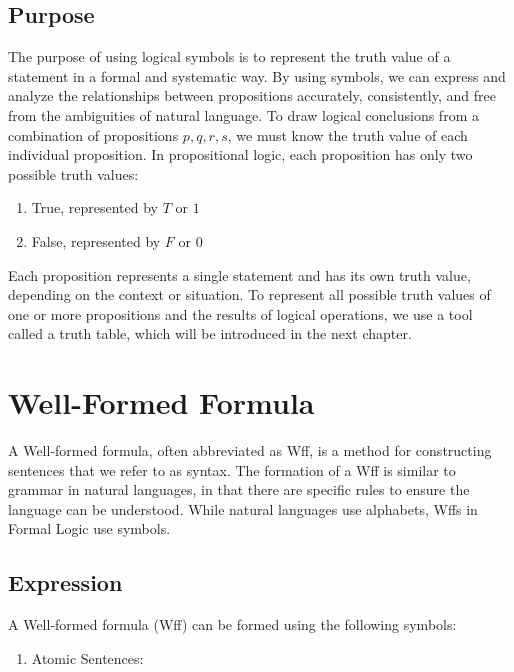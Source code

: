 \documentclass[12pt,a4paper,openany]{article}
\begin{document}
\subsection{Purpose}\label{purpose}

The purpose of using logical symbols is to represent the truth value of
a statement in a formal and systematic way. By using symbols, we can
express and analyze the relationships between propositions accurately,
consistently, and free from the ambiguities of natural language. To draw
logical conclusions from a combination of propositions \(p, q, r, s\),
we must know the truth value of each individual proposition. In
propositional logic, each proposition has only two possible truth values:

\begin{enumerate}
\item True, represented by \(T\) or \(1\)
\item False, represented by \(F\) or \(0\)
\end{enumerate}

Each proposition represents a single statement and has its own truth
value, depending on the context or situation. To represent all possible
truth values of one or more propositions and the results of logical
operations, we use a tool called a truth table, which will be
introduced in the next chapter.

\section{Well-Formed Formula}


A Well-formed formula, often abbreviated as Wff, is a method for constructing sentences that we refer to as syntax. The formation of a Wff is similar to grammar in natural languages, in that there are specific rules to ensure the language can be understood. While natural languages use alphabets, Wffs in Formal Logic use symbols.

\subsection{Expression}\label{expression}

A Well-formed formula (Wff) can be formed using the following symbols:

\begin{enumerate}
\item Atomic Sentences:
\end{enumerate}
\end{document}
